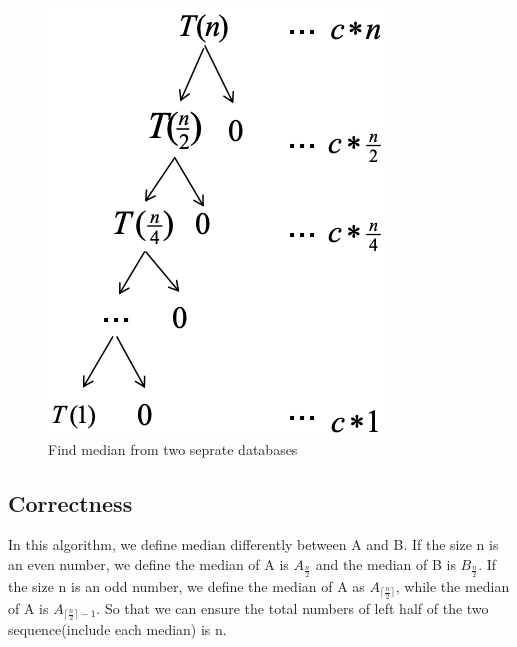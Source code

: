 \documentclass[UTF8,a4paper,12pt]{article}
\begin{document}
	\begin{figure}[htb]
		\centering
		\includegraphics[scale=.5]{./pictures/alg1/problem1-2.png}
		\caption{Find median from two seprate databases}
	\end{figure}
	
	\subsection{Correctness}
		In this algorithm, we define median differently between A and B. 
		If the size n is an even number, we define the median of A is $ A_{\frac{n}{2}} $ and the median of B is $ B_{\frac{n}{2}} $.
		If the size n is an odd number, we define the median of A as $ A_{\lceil \frac{n}{2} \rceil} $, while the median of A is $ A_{\lceil \frac{n}{2} \rceil -1} $. 
		So that we can ensure the total numbers of left half of the two sequence(include each median) is n.
	
\end{document}
